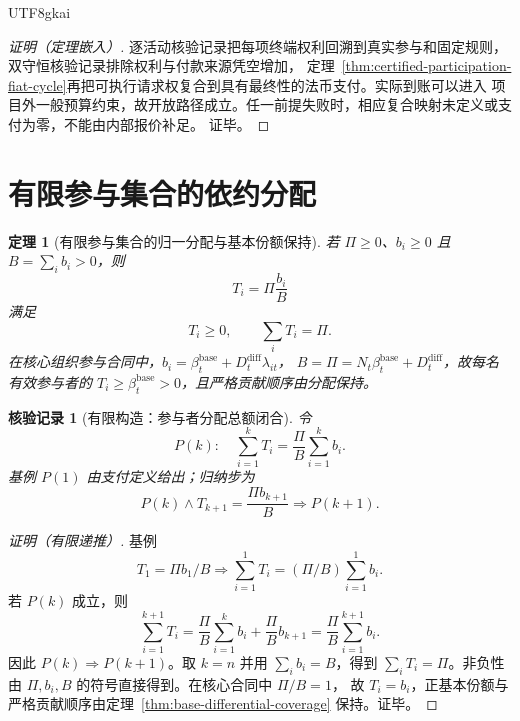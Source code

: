 \documentclass[12pt,a4paper,openany]{report}
\newtheorem{theorem}{定理}[chapter]
\newtheorem{Certificate}{核验记录}[chapter]
\begin{document}
\begin{CJK*}{UTF8}{gkai}
\begin{proof}[证明（定理嵌入）]
逐活动核验记录把每项终端权利回溯到真实参与和固定规则，双守恒核验记录排除权利与付款来源凭空增加，
定理~\ref{thm:certified-participation-fiat-cycle}再把可执行请求权复合到具有最终性的法币支付。实际到账可以进入
项目外一般预算约束，故开放路径成立。任一前提失败时，相应复合映射未定义或支付为零，不能由内部报价补足。
证毕。
\end{proof}

\section{有限参与集合的依约分配}

\begin{theorem}[有限参与集合的归一分配与基本份额保持]
\label{thm:participant-normalized-allocation}
若 \(\Pi\ge0\)、\(b_i\ge0\) 且 \(B=\sum_i b_i>0\)，则
\[
  T_i=\Pi\frac{b_i}{B}
\]
满足
\[
  T_i\ge0,\qquad
  \sum_iT_i=\Pi.
\]
在核心组织参与合同中，\(b_i=\beta_t^{\mathrm{base}}+D_t^{\mathrm{diff}}\lambda_{it}\)，
\(B=\Pi=N_t\beta_t^{\mathrm{base}}+D_t^{\mathrm{diff}}\)，故每名有效参与者的
\(T_i\ge\beta_t^{\mathrm{base}}>0\)，且严格贡献顺序由分配保持。
\end{theorem}

\begin{Certificate}[有限构造：参与者分配总额闭合]
\label{cert:participant-normalized-allocation}
令
\[
  P(k):\quad
  \sum_{i=1}^{k}T_i
  =
  \frac{\Pi}{B}\sum_{i=1}^{k}b_i.
\]
基例 \(P(1)\) 由支付定义给出；归纳步为
\[
  P(k)\wedge T_{k+1}=\frac{\Pi b_{k+1}}{B}
  \Longrightarrow P(k+1).
\]
\end{Certificate}

\begin{proof}[证明（有限递推）]
基例
\[
  T_1=\Pi b_1/B
  \Longrightarrow
  \sum_{i=1}^{1}T_i=(\Pi/B)\sum_{i=1}^{1}b_i.
\]
若 \(P(k)\) 成立，则
\[
  \sum_{i=1}^{k+1}T_i
  =
  \frac{\Pi}{B}\sum_{i=1}^{k}b_i
  +\frac{\Pi}{B}b_{k+1}
  =
  \frac{\Pi}{B}\sum_{i=1}^{k+1}b_i.
\]
因此 \(P(k)\Rightarrow P(k+1)\)。取 \(k=n\) 并用 \(\sum_i b_i=B\)，得到
\(\sum_iT_i=\Pi\)。非负性由 \(\Pi,b_i,B\) 的符号直接得到。在核心合同中 \(\Pi/B=1\)，
故 \(T_i=b_i\)，正基本份额与严格贡献顺序由定理~\ref{thm:base-differential-coverage} 保持。证毕。
\end{proof}


\end{CJK*}
\end{document}

